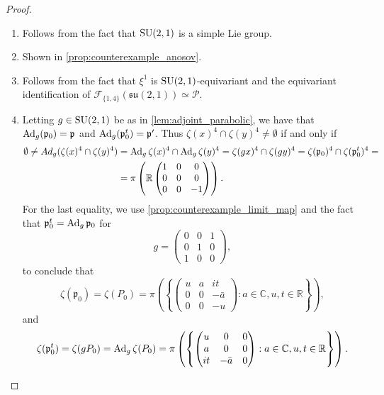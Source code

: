 \documentclass{report}
\begin{document}
\begin{proof}
\begin{enumerate}[label=(\roman*)]
\item Follows from the fact that $\operatorname{{\mathrm{SU}}}(2,1)$ is a simple Lie group.
\item Shown in \cref{prop:counterexample_anosov}.
\item Follows from the fact that $\xi^1$ is $\operatorname{{\mathrm{SU}}}(2,1)$-equivariant and the equivariant identification of $\mathcal F_{\{1, 4 \}}(\mathfrak{su}(2,1)) \simeq \mathcal P$.
\item Letting $g\in \operatorname{{\mathrm{SU}}}(2,1)$ be as in \cref{lem:adjoint_parabolic}, we have that $\operatorname{Ad}_g(\mathfrak p_0) = \mathfrak p$ and $\operatorname{Ad}_g(\mathfrak p_0^t) = \mathfrak p'$.
Thus $\zeta(x)^4 \cap \zeta(y)^4 \neq \emptyset$ if and only if
\begin{align*}
    \emptyset \neq Ad_g (\zeta(x)^4 \cap \zeta(y)^4) &=
    \operatorname{Ad}_g \zeta(x)^4 \cap \operatorname{Ad}_g \zeta(y)^4 = 
    \zeta(g x)^4 \cap \zeta(g y)^4 =
    \zeta(\mathfrak p_0)^4 \cap \zeta(\mathfrak p_0^t)^4=\\
    &= \pi \left( \mathbb R \begin{pmatrix} 1 & 0 & 0 \\ 0 & 0 & 0 \\ 0 & 0 & -1 \end{pmatrix}\right).
\end{align*}
For the last equality, we use \cref{prop:counterexample_limit_map} and the fact that $\mathfrak p_0^t = \operatorname{Ad}_g \mathfrak p_0$ for 
$$g = \begin{pmatrix} 0 & 0 & 1 \\ 0 & 1 & 0 \\ 1 & 0 & 0 \end{pmatrix},$$
to conclude that
\[
\zeta(\mathfrak p_0) = 
\zeta(P_0) = 
\pi\left(
\left\{
\begin{pmatrix} u & a & it \\ 0 & 0 & - \bar a \\ 0 & 0 & -u \end{pmatrix} :
a \in \mathbb C, u, t \in \mathbb R
\right\}
\right),
\]
and
\[
\zeta(\mathfrak p_0^t) = 
\zeta(g P_0) = \operatorname{Ad}_g \zeta(P_0) =
\pi\left(
\left\{
\begin{pmatrix} u & 0 & 0 \\ a & 0 & 0 \\ i t & - \bar a & 0 \end{pmatrix} :
a \in \mathbb C, u, t \in \mathbb R
\right\}
\right).
\]
\end{enumerate}
\end{proof}

\printindex
\printbibliography
\end{document}
